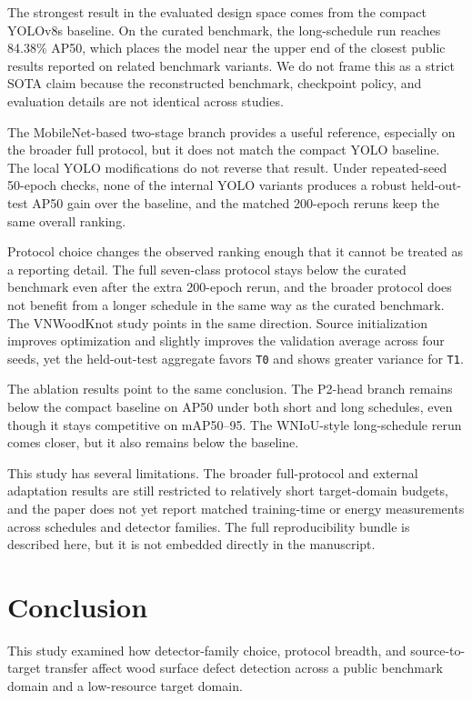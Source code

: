 \documentclass[10pt,a4paper]{article}
\begin{document}
The strongest result in the evaluated design space comes from the compact YOLOv8s baseline. On the curated benchmark, the long-schedule run reaches 84.38\% AP50, which places the model near the upper end of the closest public results reported on related benchmark variants. We do not frame this as a strict SOTA claim because the reconstructed benchmark, checkpoint policy, and evaluation details are not identical across studies.

The MobileNet-based two-stage branch provides a useful reference, especially on the broader full protocol, but it does not match the compact YOLO baseline. The local YOLO modifications do not reverse that result. Under repeated-seed 50-epoch checks, none of the internal YOLO variants produces a robust held-out-test AP50 gain over the baseline, and the matched 200-epoch reruns keep the same overall ranking.

Protocol choice changes the observed ranking enough that it cannot be treated as a reporting detail. The full seven-class protocol stays below the curated benchmark even after the extra 200-epoch rerun, and the broader protocol does not benefit from a longer schedule in the same way as the curated benchmark. The VNWoodKnot study points in the same direction. Source initialization improves optimization and slightly improves the validation average across four seeds, yet the held-out-test aggregate favors \texttt{T0} and shows greater variance for \texttt{T1}.

The ablation results point to the same conclusion. The P2-head branch remains below the compact baseline on AP50 under both short and long schedules, even though it stays competitive on mAP50--95. The WNIoU-style long-schedule rerun comes closer, but it also remains below the baseline.

This study has several limitations. The broader full-protocol and external adaptation results are still restricted to relatively short target-domain budgets, and the paper does not yet report matched training-time or energy measurements across schedules and detector families. The full reproducibility bundle is described here, but it is not embedded directly in the manuscript.

\section{Conclusion}
\label{sec:conclusion}

This study examined how detector-family choice, protocol breadth, and source-to-target transfer affect wood surface defect detection across a public benchmark domain and a low-resource target domain.
\end{document}
